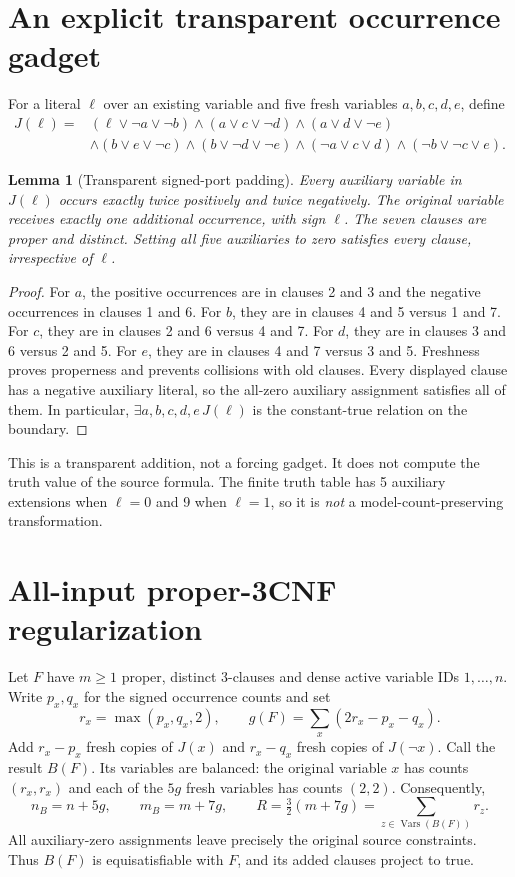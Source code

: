 \documentclass[11pt]{article}
\newtheorem{lemma}[theorem]{Lemma}
\begin{document}
\section{An explicit transparent occurrence gadget}
For a literal $\ell$ over an existing variable and five fresh variables
$a,b,c,d,e$, define
\begin{align*}
J(\ell)={}&(\ell\lor\neg a\lor\neg b)\land(a\lor c\lor\neg d)
\land(a\lor d\lor\neg e)\\
&\land(b\lor e\lor\neg c)\land(b\lor\neg d\lor\neg e)
\land(\neg a\lor c\lor d)\land(\neg b\lor\neg c\lor e).
\end{align*}
\begin{lemma}[Transparent signed-port padding]\label{lem:pad}
Every auxiliary variable in $J(\ell)$ occurs exactly twice positively and twice
negatively. The original variable receives exactly one additional occurrence,
with sign $\ell$. The seven clauses are proper and distinct. Setting all five
auxiliaries to zero satisfies every clause, irrespective of $\ell$.
\end{lemma}
\begin{proof}
For $a$, the positive occurrences are in clauses 2 and 3 and the negative
occurrences in clauses 1 and 6. For $b$, they are in clauses 4 and 5 versus
1 and 7. For $c$, they are in clauses 2 and 6 versus 4 and 7. For $d$,
they are in clauses 3 and 6 versus 2 and 5. For $e$, they are in clauses
4 and 7 versus 3 and 5. Freshness proves properness and prevents collisions
with old clauses. Every displayed clause has a negative auxiliary literal,
so the all-zero auxiliary assignment satisfies all of them. In particular,
$\exists a,b,c,d,e\,J(\ell)$ is the constant-true relation on the boundary.
\end{proof}

This is a transparent addition, not a forcing gadget. It does not compute the
truth value of the source formula. The finite truth table has 5 auxiliary
extensions when $\ell=0$ and 9 when $\ell=1$, so it is \emph{not} a
model-count-preserving transformation.

\section{All-input proper-3CNF regularization}
Let $F$ have $m\ge1$ proper, distinct 3-clauses and dense active variable IDs
$1,\ldots,n$. Write $p_x,q_x$ for the signed occurrence counts and set
\[
r_x=\max(p_x,q_x,2),\qquad
 g(F)=\sum_x(2r_x-p_x-q_x).
\]
Add $r_x-p_x$ fresh copies of $J(x)$ and $r_x-q_x$ fresh copies of $J(\neg x)$.
Call the result $B(F)$. Its variables are balanced: the original variable $x$
has counts $(r_x,r_x)$ and each of the $5g$ fresh variables has counts $(2,2)$.
Consequently,
\[
n_B=n+5g,\qquad m_B=m+7g,\qquad
 R=\tfrac32(m+7g)=\sum_{z\in\operatorname{Vars}(B(F))}r_z.
\]
All auxiliary-zero assignments leave precisely the original source constraints.
Thus $B(F)$ is equisatisfiable with $F$, and its added clauses project to true.
\end{document}

